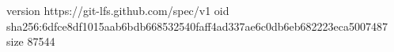 version https://git-lfs.github.com/spec/v1
oid sha256:6dfce8df1015aab6bdb668532540faff4ad337ae6c0db6eb682223eca5007487
size 87544
